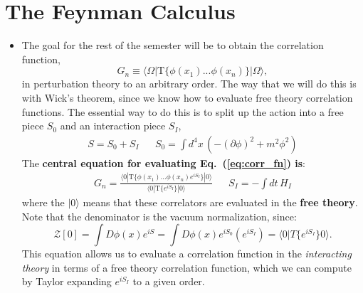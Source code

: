 \documentclass[12pt, oneside]{article}   	%
\theoremstyle{definition}
\begin{document}

\section*{The Feynman Calculus}

\begin{itemize}

	\item The goal for the rest of the semester will be to obtain the correlation function,
	\begin{equation}
		G_n\equiv \langle\Omega | \mathrm{T} \{ \phi(x_1) ... \phi(x_n) \} | \Omega\rangle, \label{eq:corr_fn}
	\end{equation}
	in perturbation theory to an arbitrary order. The way that we will do this is with Wick's theorem, since we know how to evaluate free theory correlation functions. The essential way to do this is to split up the action into a free piece $S_0$ and an interaction piece $S_I$,
	\begin{align}
		S = S_0 + S_I && S_0 = \int d^4 x\, (-(\partial\phi)^2 + m^2\phi^2)
	\end{align}
	The \textbf{central equation for evaluating Eq.~(\ref{eq:corr_fn}) is}:
	\begin{align}
		G_n = \frac{\langle 0 | \mathrm{T} \{ \phi(x_1) ... \phi(x_n) e^{i S_I} \} |0\rangle }{\langle 0 | \mathrm{T} \{ e^{i S_I} \} |0\rangle} && S_I = -\int dt\, H_I\label{eq:hamiltonian_framework}
	\end{align}
	where the $|0\rangle$ means that these correlators are evaluated in the \textbf{free theory}. Note that the denominator is the vacuum normalization, since:
	\begin{equation}
	\mathcal Z[0] = \int D\phi(x) e^{i S} = \int D\phi(x) e^{i S_0} \left( e^{i S_I}\right) = \langle 0 | T\{ e^{i S_I} \} 0\rangle.
	\end{equation}
	This equation allows us to evaluate a correlation function in the \textit{interacting theory} in terms of a free theory correlation function, which we can compute by Taylor expanding $e^{i S_I}$ to a given order. 
	

\end{itemize}
\end{document}
